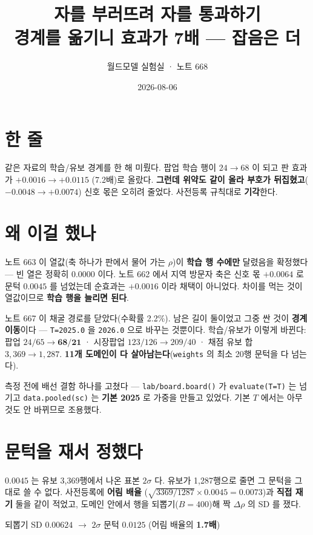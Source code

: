 \documentclass[10pt,a4paper]{article}
\title{\bfseries 자를 부러뜨려 자를 통과하기\\[2pt]
\large 경계를 옮기니 효과가 7배 --- 잡음은 더}
\author{월드모델 실험실 · 노트 668}
\date{2026-08-06}
\begin{document}
\maketitle

\section{한 줄}

같은 자료의 학습/유보 경계를 한 해 미뤘다. 팝업 학습 행이 $24 \to 68$ 이 되고 판
효과가 $+0.0016 \to \mathbf{+0.0115}$ (7.2배)로 올랐다. \textbf{그런데 위약도 같이
올라 부호가 뒤집혔고}($-0.0048 \to +0.0074$) 신호 몫은 오히려 줄었다. 사전등록
규칙대로 \textbf{기각}한다.

\section{왜 이걸 했나}

노트 663 이 열값(축 하나가 판에서 물어 가는 $\rho$)이 \textbf{학습 행 수에만}
달렸음을 확정했다 --- 빈 열은 정확히 $0.0000$ 이다. 노트 662 에서 지역 방문자 축은
신호 몫 $+0.0064$ 로 문턱 $0.0045$ 를 넘었는데 순효과는 $+0.0016$ 이라 채택이
아니었다. 차이를 먹는 것이 열값이므로 \textbf{학습 행을 늘리면 된다}.

노트 667 이 채굴 경로를 닫았다(수확률 2.2\%). 남은 길이 둘이었고 그중 싼 것이
\textbf{경계 이동}이다 --- \verb|T=2025.0| 을 \verb|2026.0| 으로 바꾸는 것뿐이다.
학습/유보가 이렇게 바뀐다: 팝업 $24/65 \to \mathbf{68/21}$ · 시장팝업
$123/126 \to 209/40$ · 채점 유보 합 $3{,}369 \to 1{,}287$. \textbf{11개 도메인이 다
살아남는다}(\verb|weights| 의 최소 20행 문턱을 다 넘는다).

측정 전에 배선 결함 하나를 고쳤다 --- \verb|lab/board.board()| 가
\verb|evaluate(T=T)| 는 넘기고 \verb|data.pooled(sc)| 는 \textbf{기본 2025} 로 가중을
만들고 있었다. 기본 $T$ 에서는 아무것도 안 바뀌므로 조용했다.

\section{문턱을 재서 정했다}

$0.0045$ 는 유보 3{,}369행에서 나온 표본 $2\sigma$ 다. 유보가 1{,}287행으로 줄면
그 문턱을 그대로 쓸 수 없다. 사전등록에 \textbf{어림 배율}
($\sqrt{3369/1287} \times 0.0045 = 0.0073$)과 \textbf{직접 재기} 둘을 같이 적었고,
도메인 안에서 행을 되뽑기($B{=}400$)해 짝 $\Delta\rho$ 의 SD 를 쟀다.

\begin{center}
되뽑기 SD $\mathbf{0.00624}$ $\to$ $2\sigma$ 문턱 $\mathbf{0.0125}$
\quad(어림 배율의 \textbf{1.7배})
\end{center}
\end{document}
